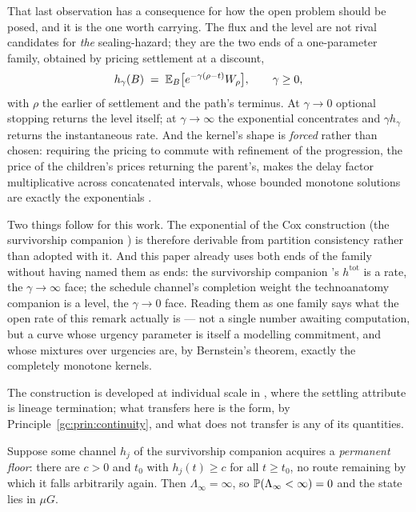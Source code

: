 \begin{remark}
That last observation has a consequence for how the open problem should
be posed, and it is the one worth carrying. The flux and the level are
not rival candidates for \emph{the} sealing-hazard; they are the two ends
of a one-parameter family, obtained by pricing settlement at a discount,
\begin{equation}\label{gc:eq:sealprice}
h_\gamma(B)\;=\;\mathbb{E}_B\bigl[e^{-\gamma(\rho-t)}W_\rho\bigr],
\qquad \gamma\ge0,
\end{equation}
with $\rho$ the earlier of settlement and the path's terminus. At
$\gamma\to0$ optional stopping returns the level itself; at
$\gamma\to\infty$ the exponential concentrates and $\gamma h_\gamma$
returns the instantaneous rate. And the kernel's shape is \emph{forced}
rather than chosen: requiring the pricing to commute with refinement of
the progression, the price of the children's prices returning the
parent's, makes the delay factor multiplicative across concatenated
intervals, whose bounded monotone solutions are exactly the exponentials
\cite{Aethus}.

Two things follow for this work. The exponential of the Cox construction
(the survivorship companion \cite{GoldenSurvivorship}) is therefore derivable from partition consistency
rather than adopted with it. And this paper already uses both ends of the
family without having named them as ends: the survivorship companion \cite{GoldenSurvivorship}'s
$h^{\mathrm{tot}}$ is a rate, the $\gamma\to\infty$ face; the schedule
channel's completion weight the technoanatomy companion \cite{GoldenTechnoanatomy} is a level, the
$\gamma\to0$ face. Reading them as one family says what the open rate of
this remark actually is --- not a single number awaiting computation, but
a curve whose urgency parameter is itself a modelling commitment, and
whose mixtures over urgencies are, by Bernstein's theorem, exactly the
completely monotone kernels.

The construction is developed at individual scale in \cite{Aethus}, where
the settling attribute is lineage termination; what transfers here is the
form, by Principle~\ref{gc:prin:continuity}, and what does not transfer
is any of its quantities.
\end{remark}

\begin{proposition}\label{gc:prop:onefloor}
Suppose some channel $h_j$ of the survivorship companion \cite{GoldenSurvivorship} acquires a
\emph{permanent floor}: there are $c>0$ and $t_0$ with
$h_j(t)\ge c$ for all $t\ge t_0$, no route remaining by which it falls
arbitrarily again. Then $\Lambda_\infty=\infty$, so
$\mathbb{P}(\Lambda_\infty<\infty)=0$ and the state lies in $\mu G$.
\end{proposition}

